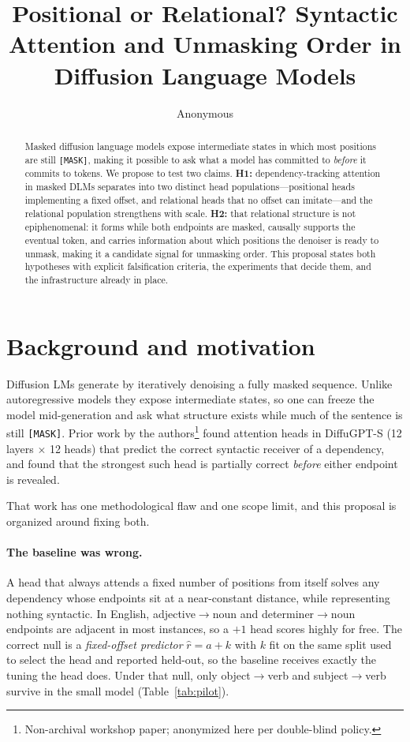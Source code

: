 \documentclass{article}
\title{Positional or Relational? Syntactic Attention and Unmasking Order in
Diffusion Language Models}
\author{%
  Anonymous \\
}
\begin{document}
\maketitle

\begin{abstract}
Masked diffusion language models expose intermediate states in which most
positions are still \texttt{[MASK]}, making it possible to ask what a model has
committed to \emph{before} it commits to tokens. We propose to test two claims.
\textbf{H1:} dependency-tracking attention in masked DLMs separates into two
distinct head populations---positional heads implementing a fixed offset, and
relational heads that no offset can imitate---and the relational population
strengthens with scale. \textbf{H2:} that relational structure is not epiphenomenal:
it forms while both endpoints are masked, causally supports the eventual token,
and carries information about which positions the denoiser is ready to unmask,
making it a candidate signal for unmasking order. This proposal states both
hypotheses with explicit falsification criteria, the experiments that decide
them, and the infrastructure already in place.
\end{abstract}

\section{Background and motivation}

Diffusion LMs generate by iteratively denoising a fully masked sequence. Unlike
autoregressive models they expose intermediate states, so one can freeze the
model mid-generation and ask what structure exists while much of the sentence is
still \texttt{[MASK]}. Prior work by the authors\footnote{Non-archival workshop
paper; anonymized here per double-blind policy.} found attention heads in
DiffuGPT-S (12 layers $\times$ 12 heads) that predict the correct syntactic
receiver of a dependency, and found that the strongest such head is partially
correct \emph{before} either endpoint is revealed.

That work has one methodological flaw and one scope limit, and this proposal is
organized around fixing both.

\paragraph{The baseline was wrong.} A head that always attends a fixed number of
positions from itself solves any dependency whose endpoints sit at a
near-constant distance, while representing nothing syntactic. In English,
adjective$\to$noun and determiner$\to$noun endpoints are adjacent in most
instances, so a $+1$ head scores highly for free. The correct null is a
\emph{fixed-offset predictor} $\hat r = a + k$ with $k$ fit on the same split
used to select the head and reported held-out, so the baseline receives exactly
the tuning the head does. Under that null, only object$\to$verb and
subject$\to$verb survive in the small model (Table~\ref{tab:pilot}).
\end{document}
